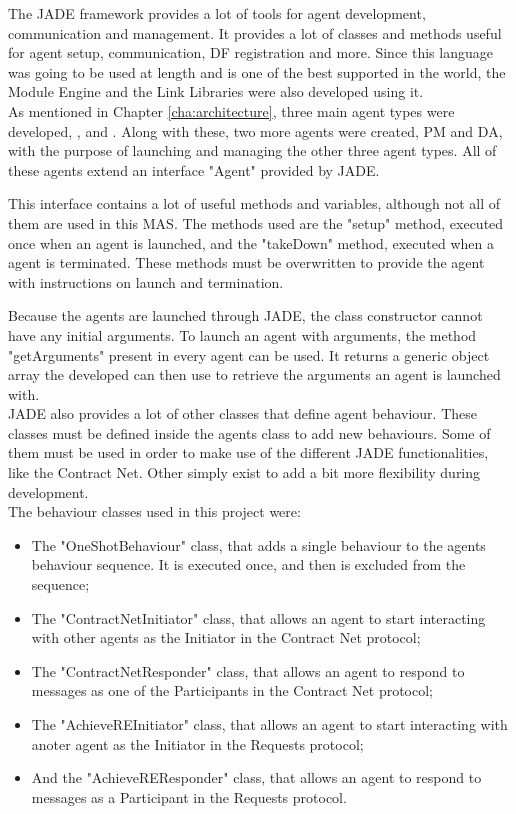 The \acrshort{JADE} framework provides a lot of tools for agent development, communication and management. It provides a lot of classes and methods useful for agent setup, communication, \acrshort{DF} registration and more. Since this language was going to be used at length and is one of the best supported in the world, the Module Engine and the Link Libraries were also developed using it.\\

As mentioned in Chapter \ref{cha:architecture}, three main agent types were developed, ,  and . Along with these, two more agents were created, \acrfull{PM} and \acrfull{DA}, with the purpose of launching and managing the other three agent types. All of these agents extend an interface "Agent" provided by \acrshort{JADE}.

This interface contains a lot of useful methods and variables, although not all of them are used in this \acrshort{MAS}. The methods used are the "setup" method, executed once when an agent is launched, and the "takeDown" method, executed when a agent is terminated. These methods must be overwritten to provide the agent with instructions on launch and termination.

Because the agents are launched through \acrshort{JADE}, the class constructor cannot have any initial arguments. To launch an agent with arguments, the method "getArguments" present in every agent can be used. It returns a generic object array the developed can then use to retrieve the arguments an agent is launched with.\\

\acrshort{JADE} also provides a lot of other classes that define agent behaviour. These classes must be defined inside the agents class to add new behaviours. Some of them must be used in order to make use of the different \acrshort{JADE} functionalities, like the Contract Net. Other simply exist to add a bit more flexibility during development.\\

The behaviour classes used in this project were:
\begin{itemize}
	\item The "OneShotBehaviour" class, that adds a single behaviour to the agents behaviour sequence. It is executed once, and then is excluded from the sequence;
	\item The "ContractNetInitiator" class, that allows an agent to start interacting with other agents as the Initiator in the Contract Net protocol;
	\item The "ContractNetResponder" class, that allows an agent to respond to messages as one of the Participants in the Contract Net protocol;
	\item The "AchieveREInitiator" class, that allows an agent to start interacting with anoter agent as the Initiator in the Requests protocol;
	\item And the "AchieveREResponder" class, that allows an agent to respond to messages as a Participant in the Requests protocol.
\end{itemize}


